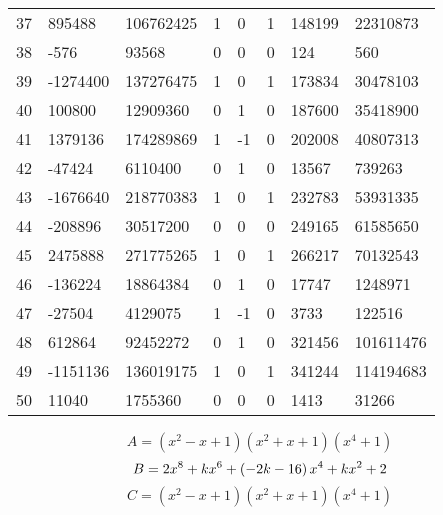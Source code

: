\documentclass{amsart}
\begin{document}
\begin{longtable}{|l|l|l|lllll|}
37&895488&106762425&1&0&1&148199&22310873\\
38&-576&93568&0&0&0&124&560\\
39&-1274400&137276475&1&0&1&173834&30478103\\
40&100800&12909360&0&1&0&187600&35418900\\
41&1379136&174289869&1&-1&0&202008&40807313\\
42&-47424&6110400&0&1&0&13567&739263\\
43&-1676640&218770383&1&0&1&232783&53931335\\
44&-208896&30517200&0&0&0&249165&61585650\\
45&2475888&271775265&1&0&1&266217&70132543\\
46&-136224&18864384&0&1&0&17747&1248971\\
47&-27504&4129075&1&-1&0&3733&122516\\
48&612864&92452272&0&1&0&321456&101611476\\
49&-1151136&136019175&1&0&1&341244&114194683\\
50&11040&1755360&0&0&0&1413&31266\\
\hline
\end{longtable}
$$A=(x^2
 - x
 + 1)(x^2
 + x
 + 1)(x^4
 + 1)$$
$$B=2\*x^8
 + k\*x^6
 + \left(-2\*k
 - 16\right) \*x^4
 + k\*x^2
 + 2$$
$$C=(x^2
 - x
 + 1)(x^2
 + x
 + 1)(x^4
 + 1)$$
\end{document}
